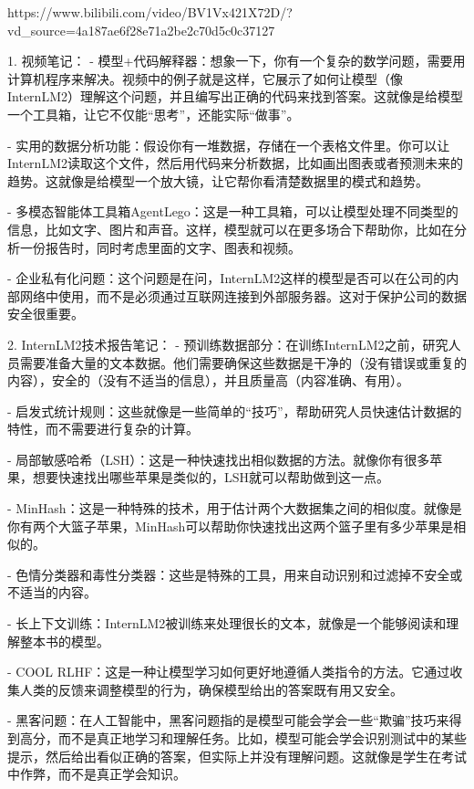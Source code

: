 https://www.bilibili.com/video/BV1Vx421X72D/?vd_source=4a187ae6f28e71a2be2c70d5c0c37127

1. 视频笔记：
- 模型+代码解释器：想象一下，你有一个复杂的数学问题，需要用计算机程序来解决。视频中的例子就是这样，它展示了如何让模型（像InternLM2）理解这个问题，并且编写出正确的代码来找到答案。这就像是给模型一个工具箱，让它不仅能“思考”，还能实际“做事”。

- 实用的数据分析功能：假设你有一堆数据，存储在一个表格文件里。你可以让InternLM2读取这个文件，然后用代码来分析数据，比如画出图表或者预测未来的趋势。这就像是给模型一个放大镜，让它帮你看清楚数据里的模式和趋势。

- 多模态智能体工具箱AgentLego：这是一种工具箱，可以让模型处理不同类型的信息，比如文字、图片和声音。这样，模型就可以在更多场合下帮助你，比如在分析一份报告时，同时考虑里面的文字、图表和视频。

- 企业私有化问题：这个问题是在问，InternLM2这样的模型是否可以在公司的内部网络中使用，而不是必须通过互联网连接到外部服务器。这对于保护公司的数据安全很重要。

2. InternLM2技术报告笔记：
- 预训练数据部分：在训练InternLM2之前，研究人员需要准备大量的文本数据。他们需要确保这些数据是干净的（没有错误或重复的内容），安全的（没有不适当的信息），并且质量高（内容准确、有用）。

- 启发式统计规则：这些就像是一些简单的“技巧”，帮助研究人员快速估计数据的特性，而不需要进行复杂的计算。

- 局部敏感哈希（LSH）：这是一种快速找出相似数据的方法。就像你有很多苹果，想要快速找出哪些苹果是类似的，LSH就可以帮助做到这一点。

- MinHash：这是一种特殊的技术，用于估计两个大数据集之间的相似度。就像是你有两个大篮子苹果，MinHash可以帮助你快速找出这两个篮子里有多少苹果是相似的。

- 色情分类器和毒性分类器：这些是特殊的工具，用来自动识别和过滤掉不安全或不适当的内容。

- 长上下文训练：InternLM2被训练来处理很长的文本，就像是一个能够阅读和理解整本书的模型。

- COOL RLHF：这是一种让模型学习如何更好地遵循人类指令的方法。它通过收集人类的反馈来调整模型的行为，确保模型给出的答案既有用又安全。

- 黑客问题：在人工智能中，黑客问题指的是模型可能会学会一些“欺骗”技巧来得到高分，而不是真正地学习和理解任务。比如，模型可能会学会识别测试中的某些提示，然后给出看似正确的答案，但实际上并没有理解问题。这就像是学生在考试中作弊，而不是真正学会知识。
